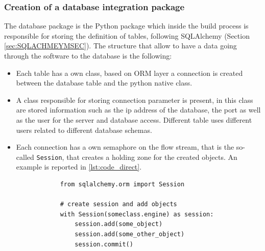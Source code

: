 \documentclass[../main.tex]{subfiles}
\begin{document}
\subsubsection{Creation of a database integration package}
The database package is the Python package which inside the build process is responsible for storing the definition of tables, following SQLAlchemy (Section \ref{sec:SQLACHMEYMSEC}).
The structure that allow to have a data going through the software to the database is the following:
\begin{itemize}
    \item Each table has a own class, based on \gls{ORM} layer a connection is created between the database table and the python native class. 
    \item A class responsible for storing connection parameter is present, in this class are stored information such as the ip address of the database, the port as well as the user for the server and database access. Different table uses different users related to different database schemas. 
    \item Each connection has a own semaphore on the flow stream, that is the so-called \texttt{Session}, that creates a holding zone for the created objects. An example is reported in \ref{lst:code_direct}.
        \lstset{language=Python}
        \lstset{frame=lines}
        \lstset{basicstyle=\footnotesize}
        \begin{lstlisting}
            from sqlalchemy.orm import Session
            
            # create session and add objects
            with Session(someclass.engine) as session:
                session.add(some_object)
                session.add(some_other_object)
                session.commit()
        \end{lstlisting}
\end{itemize}
\end{document}
